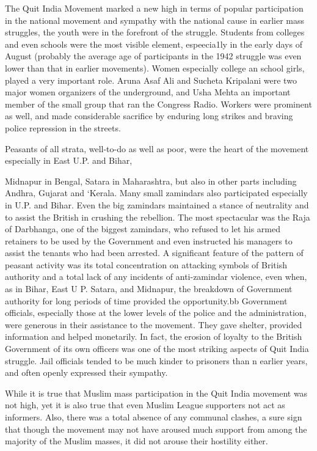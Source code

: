 \begin{multicols}{2}
The Quit India Movement marked a new high in terms of popular participation in the national movement and sympathy with the national cause in earlier mass struggles, the youth were in the forefront of the struggle. Students from colleges and even schools were the most visible element, espeecia1ly in the early days of August (probably the average age of participants in the 1942 struggle was even lower than that in earlier movements). Women especially college an school girls, played a very important role. Aruna Asaf Ali and Sucheta Kripalani were two major women organizers of the underground, and Usha Mehta an important member of the small group that ran the Congress Radio. Workers were prominent as well, and made considerable sacrifice by enduring long strikes and braving police repression in the streets.

Peasants of all strata, well-to-do as well as poor, were the heart of the movement especially in East U.P. and Bihar,

Midnapur in Bengal, Satara in Maharashtra, but also in other parts including Andhra, Gujarat and `Kerala. Many small zamindars also participated especially in U.P. and Bihar. Even the big zamindars maintained a stance of neutrality and to assist the British in crushing the rebellion. The most spectacular was the Raja of Darbhanga, one of the biggest zamindars, who refused to let his armed retainers to be used by the Government and even instructed his managers to assist the tenants who had been arrested. A significant feature of the pattern of peasant activity was its total concentration on attacking symbols of British authority and a total lack of any incidents of anti-zamindar violence, even when, as in Bihar, East U P. Satara, and Midnapur, the breakdown of Government authority for long periods of time provided the opportunity.bb Government officials, especially those at the lower levels of the police and the administration, were generous in their assistance to the movement. They gave shelter, provided information and helped monetarily. In fact, the erosion of loyalty to the British Government of its own officers was one of the most striking aspects of Quit India struggle. Jail officials tended to be much kinder to prisoners than n earlier years, and often openly expressed their sympathy.

While it is true that Muslim mass participation in the Quit India movement was not high, yet it is also true that even Muslim League supporters not act as informers. Also, there was a total absence of any communal clashes, a sure sign that though the movement may not have aroused much support from among the majority of the Muslim masses, it did not arouse their hostility either.


\end{multicols}
